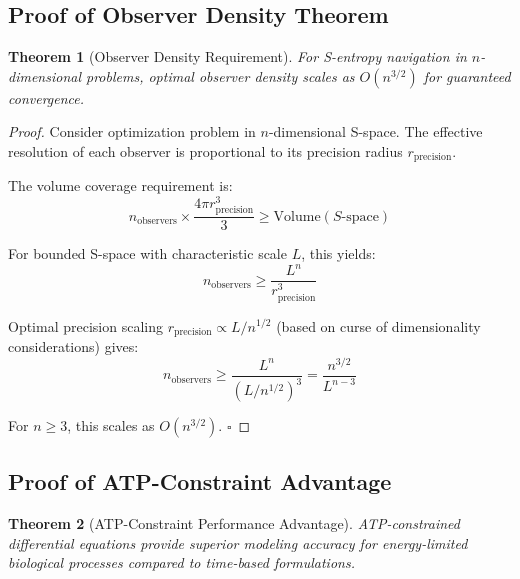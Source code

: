 \documentclass[12pt,a4paper]{article}
\newtheorem{theorem}{Theorem}
\begin{document}
\subsection{Proof of Observer Density Theorem}

\begin{theorem}[Observer Density Requirement]
For S-entropy navigation in $n$-dimensional problems, optimal observer density scales as $O(n^{3/2})$ for guaranteed convergence.
\end{theorem}

\begin{proof}
Consider optimization problem in $n$-dimensional S-space. The effective resolution of each observer is proportional to its precision radius $r_{\text{precision}}$.

The volume coverage requirement is:
\begin{equation}
n_{\text{observers}} \times \frac{4\pi r_{\text{precision}}^3}{3} \geq \text{Volume}(S\text{-space})
\end{equation}

For bounded S-space with characteristic scale $L$, this yields:
\begin{equation}
n_{\text{observers}} \geq \frac{L^n}{r_{\text{precision}}^3}
\end{equation}

Optimal precision scaling $r_{\text{precision}} \propto L/n^{1/2}$ (based on curse of dimensionality considerations) gives:
\begin{equation}
n_{\text{observers}} \geq \frac{L^n}{(L/n^{1/2})^3} = \frac{n^{3/2}}{L^{n-3}}
\end{equation}

For $n \geq 3$, this scales as $O(n^{3/2})$. $\square$
\end{proof}

\subsection{Proof of ATP-Constraint Advantage}

\begin{theorem}[ATP-Constraint Performance Advantage]
ATP-constrained differential equations provide superior modeling accuracy for energy-limited biological processes compared to time-based formulations.
\end{theorem}
\end{document}
